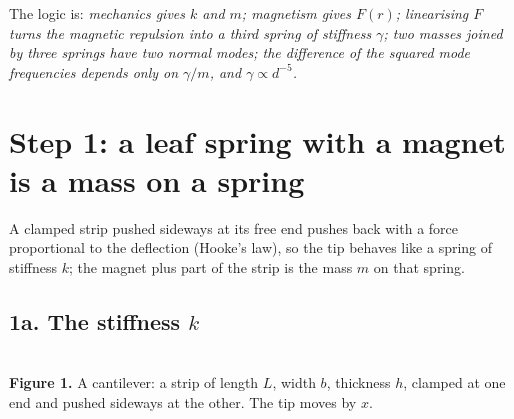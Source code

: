 \documentclass[11pt,a4paper]{article}
\begin{document}
\noindent The logic is: \emph{mechanics gives $k$ and $m$; magnetism gives $F(r)$; linearising $F$ turns the magnetic repulsion into a third spring of stiffness $\gamma$; two masses joined by three springs have two normal modes; the difference of the squared mode frequencies depends only on $\gamma/m$, and $\gamma\propto d^{-5}$.}

\clearpage
\section{Step 1: a leaf spring with a magnet is a mass on a spring}

\begin{idea}
A clamped strip pushed sideways at its free end pushes back with a force proportional to the deflection (Hooke's law), so the tip behaves like a spring of stiffness $k$; the magnet plus part of the strip is the mass $m$ on that spring.
\end{idea}

\subsection*{1a. The stiffness $k$}

\begin{center}
\\[2pt]
{\small\textbf{Figure 1.} A cantilever: a strip of length $L$, width $b$, thickness $h$, clamped at one end and pushed sideways at the other. The tip moves by $x$.}
\end{center}
\end{document}

